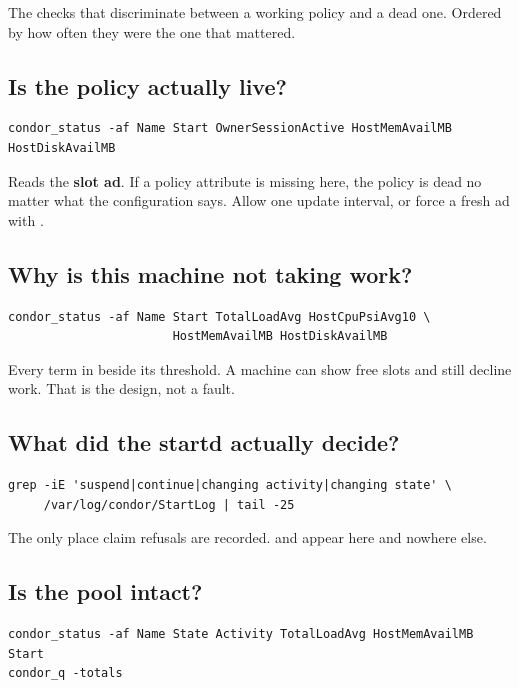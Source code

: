 The checks that discriminate between a working policy and a dead one. Ordered by
how often they were the one that mattered.

\subsection{Is the policy actually live?}

\begin{lstlisting}[style=term]
condor_status -af Name Start OwnerSessionActive HostMemAvailMB HostDiskAvailMB
\end{lstlisting}

Reads the \textbf{slot ad}. If a policy attribute is missing here, the policy is
dead no matter what the configuration says. Allow one update interval, or force
a fresh ad with .

\subsection{Why is this machine not taking work?}

\begin{lstlisting}[style=term]
condor_status -af Name Start TotalLoadAvg HostCpuPsiAvg10 \
                       HostMemAvailMB HostDiskAvailMB
\end{lstlisting}

Every term in  beside its threshold. A machine can show free slots and
still decline work. That is the design, not a fault.

\subsection{What did the startd actually decide?}

\begin{lstlisting}[style=term]
grep -iE 'suspend|continue|changing activity|changing state' \
     /var/log/condor/StartLog | tail -25
\end{lstlisting}

The only place claim refusals are recorded.  and  appear here and nowhere else.

\subsection{Is the pool intact?}

\begin{lstlisting}[style=term]
condor_status -af Name State Activity TotalLoadAvg HostMemAvailMB Start
condor_q -totals
\end{lstlisting}

